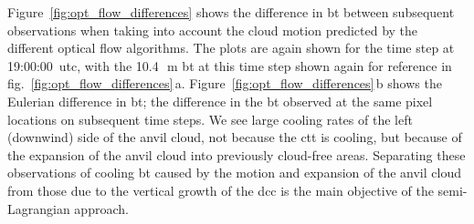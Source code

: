 Figure~\ref{fig:opt_flow_differences} shows the difference in \acrshort{bt} between subsequent observations when taking into account the cloud motion predicted by the different optical flow algorithms.
The plots are again shown for the time step at 19:00:00~\acrshort{utc}, with the 10.4\,\unit{\mu m} \acrshort{bt} at this time step shown again for reference in fig.~\ref{fig:opt_flow_differences}\,a.
Figure~\ref{fig:opt_flow_differences}\,b shows the Eulerian difference in \acrshort{bt}; the difference in the \acrshort{bt} observed at the same pixel locations on subsequent time steps.
We see large cooling rates of the left (downwind) side of the anvil cloud, not because the \acrshort{ctt} is cooling, but because of the expansion of the anvil cloud into previously cloud-free areas.
Separating these observations of cooling \acrshort{bt} caused by the motion and expansion of the anvil cloud from those due to the vertical growth of the \acrshort{dcc} is the main objective of the semi-Lagrangian approach.


